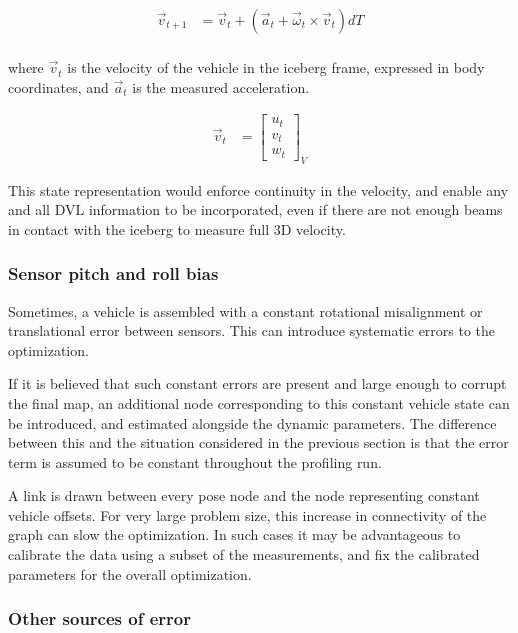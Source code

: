 \begin{align}
\vec{v}_{t+1} &= \vec{v}_t + \left( \vec{a}_t + \vec{\omega}_t \times \vec{v}_t \right)dT\\
\end{align}

where $\vec{v}_t$ is the velocity of the vehicle in the iceberg frame, expressed in body coordinates, and $\vec{a}_t$ is the measured acceleration.
 
\begin{align}
\vec{v}_{t} &=  \left[\begin{array}{c}
                     u_t \\ v_t \\ w_t
                     \end{array}\right]_V
\end{align}

This state representation would enforce continuity in the velocity, and enable any and all DVL information to be incorporated, even if there are not enough beams in contact with the iceberg to measure full 3D velocity.

\subsubsection{Sensor pitch and roll bias}

Sometimes, a vehicle is assembled with a constant rotational misalignment or translational error between sensors. This can introduce systematic errors to the optimization.

If it is believed that such constant errors are present and large enough to corrupt the final map, an additional node corresponding to this constant vehicle state can be introduced, and estimated alongside the dynamic parameters. The difference between this and the situation considered in the previous section is that the error term is assumed to be constant throughout the profiling run. 

A link is drawn between every pose node and the node representing constant vehicle offsets. For very large problem size, this increase in connectivity of the graph can slow the optimization. In such cases it may be advantageous to calibrate the data using a subset of the measurements, and fix the calibrated parameters for the overall optimization. 

\subsubsection{Other sources of error}

